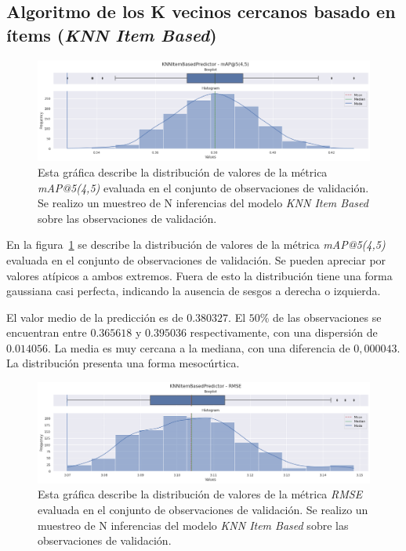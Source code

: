 \documentclass[11pt,a4paper,twoside]{thesis}
\begin{document}
\clearpage

\subsection{
	Algoritmo de los K vecinos cercanos basado
	en ítems (\textit{KNN Item Based})
}

\begin{figure}[!htb]
	\centering
	\includegraphics[width=15cm]{./images/metrics-knn-item-based-mapk.png}
	\caption{
		Esta gráfica describe la distribución de valores de la métrica
		\textit{mAP@5(4,5)} evaluada en el conjunto de observaciones de
		validación. Se realizo un muestreo de N inferencias del modelo
		\textit{KNN Item Based} sobre las observaciones de validación.
	}
	\label{fig:knnItemMAP}
\end{figure}

En la figura~\ref{fig:knnItemMAP} se describe la distribución de valores de la
métrica \textit{mAP@5(4,5)} evaluada en el conjunto de observaciones de
validación. Se pueden apreciar por valores atípicos a ambos extremos. Fuera de
esto la distribución tiene una forma gaussiana casi perfecta, indicando la
ausencia de sesgos a derecha o izquierda.

El valor medio de la predicción es de $0.380327$. El $50$\% de las
observaciones se encuentran entre $0.365618$ y $0.395036$ respectivamente, con
una dispersión de $0.014056$. La media es muy cercana a la mediana, con una
diferencia de $0,000043$. La distribución presenta una forma mesocúrtica.

\clearpage

\begin{figure}[!htb]
	\centering
	\includegraphics[width=15cm]{./images/metrics-knn-item-based-RMSE.png}
	\caption{
		Esta gráfica describe la distribución de valores de la métrica
		\textit{RMSE} evaluada en el conjunto de observaciones de
		validación. Se realizo un muestreo de N inferencias del modelo
		\textit{KNN Item Based} sobre las observaciones de validación.
	}
	\label{fig:knnItemRMSE}
\end{figure}
\end{document}
